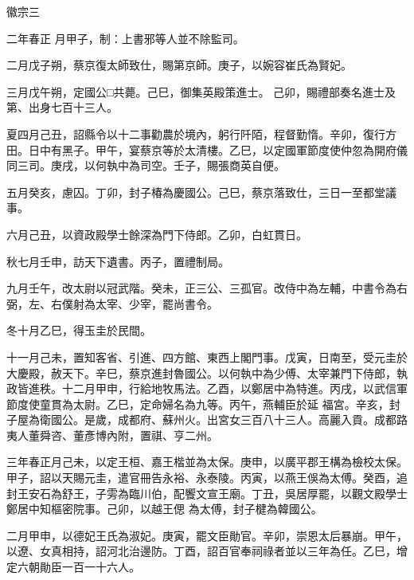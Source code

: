 
\begin{pinyinscope}

 徽宗三



 二年春正
 月甲子，制：上書邪等人並不除監司。



 二月戊子朔，蔡京復太師致仕，賜第京師。庚子，以婉容崔氏為賢妃。



 三月戊午朔，定國公□共薨。己巳，御集英殿策進士。
 己卯，賜禮部奏名進士及第、出身七百十三人。



 夏四月己丑，詔縣令以十二事勸農於境內，躬行阡陌，程督勤惰。辛卯，復行方田。日中有黑子。甲午，宴蔡京等於太清樓。乙巳，以定國軍節度使仲忽為開府儀同三司。庚戌，以何執中為司空。壬子，賜張商英自便。



 五月癸亥，慮囚。丁卯，封子椿為慶國公。己巳，蔡京落致仕，三日一至都堂議事。



 六月己丑，以資政殿學士餘深為門下侍郎。乙卯，白虹貫日。



 秋七月壬申，訪天下遺書。丙子，置禮制局。



 九月壬午，改太尉以冠武階。癸未，正三公、三孤官。改侍中為左輔，中書令為右弼，左、右僕射為太宰、少宰，罷尚書令。



 冬十月乙巳，得玉圭於民間。



 十一月己未，置知客省、引進、四方館、東西上閣門事。戊寅，日南至，受元圭於大慶殿，赦天下。辛巳，蔡京進封魯國公。以何執中為少傅、太宰兼門下侍郎，執政皆進秩。十二月甲申，行給地牧馬法。乙酉，以鄭居中為特進。丙戌，以武信軍節度使童貫為太尉。乙巳，定命婦名為九等。丙午，燕輔臣於延
 福宮。辛亥，封子屋為衛國公。是歲，成都府、蘇州火。出宮女三百八十三人。高麗入貢。成都路夷人董舜咨、董彥博內附，置祺、亨二州。



 三年春正月己未，以定王桓、嘉王楷並為太保。庚申，以廣平郡王構為檢校太保。甲子，詔以天賜元圭，遣官冊告永裕、永泰陵。丙寅，以燕王俁為太傅。癸酉，追封王安石為舒王，子雱為臨川伯，配饗文宣王廟。丁丑，吳居厚罷，以觀文殿學士鄭居中知樞密院事。己卯，以越王偲
 為太傅，封子楗為韓國公。



 二月甲申，以德妃王氏為淑妃。庚寅，罷文臣勛官。辛卯，崇恩太后暴崩。甲午，以遼、女真相持，詔河北治邊防。丁酉，詔百官奉祠祿者並以三年為任。乙巳，增定六朝勛臣一百一十六人。




\end{pinyinscope}
